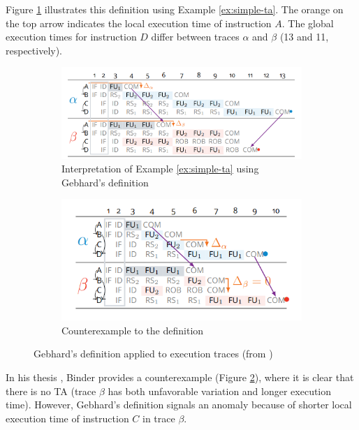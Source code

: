 Figure \ref{fig:step-good} illustrates this definition using Example \ref{ex:simple-ta}. The orange on the top arrow indicates the local execution time of instruction $A$. The global execution times for instruction $D$ differ between traces $\alpha$ and $\beta$ (13 and 11, respectively).

\begin{figure}[!htb]
    \centering
    \begin{subfigure}[t]{0.5\textwidth}
        \centering
        \includegraphics[width=\textwidth]{figures/step-func-good.png}
        \caption{Interpretation of Example \ref{ex:simple-ta} using Gebhard's definition}
        \label{fig:step-good}
    \end{subfigure}
    \hfill
    \begin{subfigure}[t]{0.49\textwidth}
        \centering
        \includegraphics[width=\textwidth]{figures/step-func-bad.png}
        \caption{Counterexample to the definition}
        \label{fig:step-bad}
    \end{subfigure}
    \caption{Gebhard's definition applied to execution traces (from \cite{binder_definitions_2022})}
    \label{fig:step}
\end{figure}

In his thesis \cite{binder_definitions_2022}, Binder provides a counterexample (Figure \ref{fig:step-bad}), where it is clear that there is no TA (trace $\beta$ has both unfavorable variation and longer execution time). However, Gebhard's definition signals an anomaly because of shorter local execution time of instruction $C$ in trace $\beta$.

